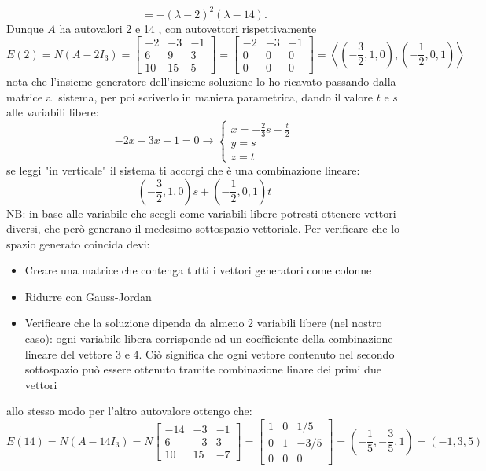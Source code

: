 \[
	=-(\lambda-2)^2(\lambda-14) .
\]
Dunque $A$ ha autovalori 2 e 14 , con autovettori rispettivamente
\[
	E(2)=N\left(A-2 I_3\right)=
	\begin{bmatrix}
		-2 & -3 & -1 \\
		6  & 9  & 3  \\
		10 & 15 & 5
	\end{bmatrix}
	=
	\begin{bmatrix}
		-2 & -3 & -1 \\
		0  & 0  & 0  \\
		0  & 0  & 0
	\end{bmatrix}
	=\left<\left( -\frac{3}{2}, 1, 0 \right) , \left( -\frac{1}{2},0,1 \right)  \right>
\]
nota che l'insieme generatore dell'insieme soluzione lo ho ricavato passando dalla matrice al sistema, per poi scriverlo in maniera parametrica, dando il valore $ t $ e $ s $ alle variabili libere:
\[
	-2x -3x -1 = 0 \rightarrow
	\begin{cases}
		x = -\frac{2}{3}s - \frac{t}{2} \\
		y = s                           \\
		z = t
	\end{cases}
\]
se leggi "in verticale" il sistema ti accorgi che è una combinazione lineare:
\[
	\left( -\frac{3}{2}, 1, 0 \right) s + \left( -\frac{1}{2}, 0, 1\right)t
\]
NB: in base alle variabile che scegli come variabili libere potresti ottenere vettori diversi, che però generano il medesimo sottospazio vettoriale. Per verificare che lo spazio generato coincida devi:
\begin{itemize}
	\item Creare una matrice che contenga tutti i vettori generatori come colonne
	\item Ridurre con Gauss-Jordan
	\item Verificare che la soluzione dipenda da almeno 2 variabili libere (nel nostro caso): ogni variabile libera corrisponde ad un coefficiente della combinazione lineare del vettore 3 e 4. Ciò significa che ogni vettore contenuto nel secondo sottospazio può essere ottenuto tramite combinazione linare dei primi due vettori
\end{itemize}
allo stesso modo per l'altro autovalore ottengo che:
\[
	E(14)=N\left(A-14 I_3\right)=N
	\begin{bmatrix}
		-14 & -3 & -1 \\
		6   & -3 & 3  \\
		10  & 15 & -7
	\end{bmatrix}
	=
	\begin{bmatrix}
		1 & 0 & 1 / 5  \\
		0 & 1 & -3 / 5 \\
		0 & 0 & 0
	\end{bmatrix}
	= \left( -\frac{1}{5}, - \frac{3}{5}, 1 \right) = \left( -1,3,5 \right)
\]


